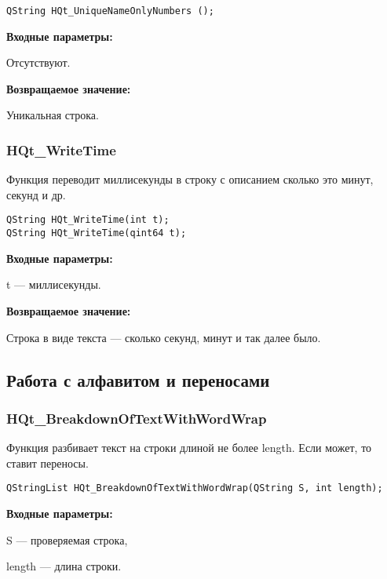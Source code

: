 \documentclass[a4paper,12pt]{article}
\begin{document}
\begin{lstlisting}[label=code_syntax_HQt_UniqueNameOnlyNumbers,caption=Синтаксис]
QString HQt_UniqueNameOnlyNumbers ();
\end{lstlisting}

\textbf{Входные параметры:}

Отсутствуют.

\textbf{Возвращаемое значение:}

Уникальная строка.


\subsubsection{HQt\_WriteTime}\label{HQt_WriteTime}

Функция переводит миллисекунды в строку с описанием сколько это минут, секунд и др.


\begin{lstlisting}[label=code_syntax_HQt_WriteTime,caption=Синтаксис]
QString HQt_WriteTime(int t);
QString HQt_WriteTime(qint64 t);
\end{lstlisting}

\textbf{Входные параметры:}

t --- миллисекунды.

\textbf{Возвращаемое значение:}

Строка в виде текста --- сколько секунд, минут и так далее было.


\subsection{Работа с алфавитом и переносами}

\subsubsection{HQt\_BreakdownOfTextWithWordWrap}\label{HQt_BreakdownOfTextWithWordWrap}

Функция разбивает текст на строки длиной не более length. Если может, то ставит переносы.


\begin{lstlisting}[label=code_syntax_HQt_BreakdownOfTextWithWordWrap,caption=Синтаксис]
QStringList HQt_BreakdownOfTextWithWordWrap(QString S, int length);
\end{lstlisting}

\textbf{Входные параметры:}

S --- проверяемая строка,

length ---  длина строки.
\end{document}
